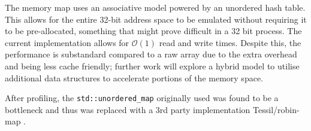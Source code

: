 The memory map uses an associative model powered by an unordered hash table. This allows for the entire 32-bit address space to be emulated without requiring it to be pre-allocated, something that might prove difficult in a 32 bit process. The current implementation allows for $\mathcal{O}(1)$ read and write times. Despite this, the performance is substandard compared to a raw array due to the extra overhead and being less cache friendly; further work will explore a hybrid model to utilise additional data structures to accelerate portions of the memory space.

After profiling, the \texttt{std::unordered\_map} originally used was found to be a bottleneck and thus was replaced with a 3rd party implementation Tessil/robin-map \cite{tessil-map, tessil-benchmark}.
